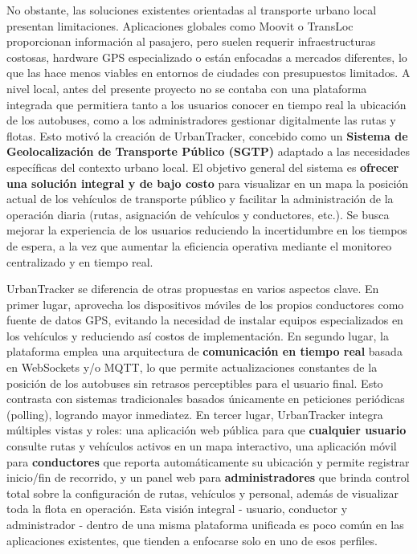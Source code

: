 \documentclass[
]{article}
\begin{document}
No obstante, las soluciones existentes orientadas al transporte urbano
local presentan limitaciones. Aplicaciones globales como Moovit o
TransLoc proporcionan información al pasajero, pero suelen requerir
infraestructuras costosas, hardware GPS especializado o están enfocadas
a mercados diferentes, lo que las hace menos viables en entornos de
ciudades con presupuestos limitados. A nivel local, antes del presente
proyecto no se contaba con una plataforma integrada que permitiera tanto
a los usuarios conocer en tiempo real la ubicación de los autobuses,
como a los administradores gestionar digitalmente las rutas y flotas.
Esto motivó la creación de UrbanTracker, concebido como un
\textbf{Sistema de Geolocalización de Transporte Público (SGTP)}
adaptado a las necesidades específicas del contexto urbano local. El
objetivo general del sistema es \textbf{ofrecer una solución integral y
de bajo costo} para visualizar en un mapa la posición actual de los
vehículos de transporte público y facilitar la administración de la
operación diaria (rutas, asignación de vehículos y conductores, etc.).
Se busca mejorar la experiencia de los usuarios reduciendo la
incertidumbre en los tiempos de espera, a la vez que aumentar la
eficiencia operativa mediante el monitoreo centralizado y en tiempo
real.

UrbanTracker se diferencia de otras propuestas en varios aspectos clave.
En primer lugar, aprovecha los dispositivos móviles de los propios
conductores como fuente de datos GPS, evitando la necesidad de instalar
equipos especializados en los vehículos y reduciendo así costos de
implementación. En segundo lugar, la plataforma emplea una arquitectura
de \textbf{comunicación en tiempo real} basada en WebSockets y/o MQTT,
lo que permite actualizaciones constantes de la posición de los
autobuses sin retrasos perceptibles para el usuario final. Esto
contrasta con sistemas tradicionales basados únicamente en peticiones
periódicas (polling), logrando mayor inmediatez. En tercer lugar,
UrbanTracker integra múltiples vistas y roles: una aplicación web
pública para que \textbf{cualquier usuario} consulte rutas y vehículos
activos en un mapa interactivo, una aplicación móvil para
\textbf{conductores} que reporta automáticamente su ubicación y permite
registrar inicio/fin de recorrido, y un panel web para
\textbf{administradores} que brinda control total sobre la configuración
de rutas, vehículos y personal, además de visualizar toda la flota en
operación. Esta visión integral - usuario, conductor y administrador -
dentro de una misma plataforma unificada es poco común en las
aplicaciones existentes, que tienden a enfocarse solo en uno de esos
perfiles.
\end{document}
